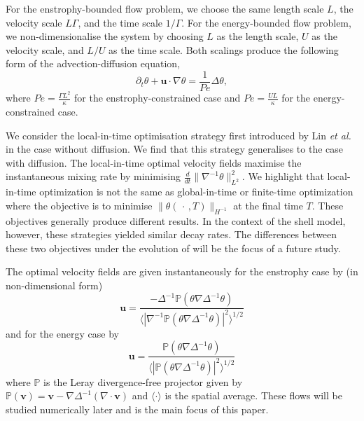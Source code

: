 \documentclass[12pt]{iopart}
\newcommand{\ddt}[1]{\frac{d #1}{dt}}
\newcommand{\hmone}[1]{\|\nabla^{-1} #1\|_{L^{2}}}
\renewcommand{\vec}[1]{\mathbf{#1}}
\newcommand{\ppt}[1]{\partial_{t} #1}
\newcommand{\lap}{\Delta }
\newcommand{\invlap}{\Delta^{-1}}
\begin{document}
For the enstrophy-bounded flow problem, we choose the same length scale $L$, the velocity scale $L\Gamma $, and  the time scale $1/\Gamma$. For the energy-bounded flow problem, we non-dimensionalise the system by choosing $L$ as the length scale, $U$ as the velocity scale, and $L/U$ as the time scale.  Both scalings produce the following form of the advection-diffusion equation,
\begin{equation}
\label{eq:nd_ade}
	\ppt{\theta}+\mathbf{u}\cdot \nabla \theta=\frac{1}{Pe} \lap\theta,
\end{equation}
where $Pe=  \frac{\Gamma L^2}{\kappa}$ for the enstrophy-constrained case and $Pe= \frac{UL}{\kappa}$ for the energy-constrained case.   

We consider the local-in-time optimisation strategy first introduced by Lin {\it et al.} \cite{JFM2011} in the case without diffusion. We find that this strategy generalises to the case with diffusion. The local-in-time optimal velocity fields maximise the instantaneous mixing rate by minimising $\ddt{}\hmone{\theta}^2$. We highlight that local-in-time optimization is not the same as global-in-time or finite-time optimization where the objective is to minimise $\|\theta(\,\cdot\, , T)\|_{H^{-1}}$ at the final time $T$. These objectives generally produce different results.  In the context of the shell model, however, these strategies yielded similar decay rates. The differences between these two objectives under the evolution of    will be the focus of a future study. 

The optimal velocity fields are given instantaneously for the enstrophy case by (in non-dimensional form)
%
\begin{equation}
\mathbf{u}= \frac{-\invlap\mathds{P}(\theta \nabla \invlap\theta)}{\langle |\nabla^{-1}\mathds{P}(\theta \nabla \invlap\theta)|^2\rangle^{1/2}}
\end{equation}
%
and for the energy case by 
% 
\begin{equation}
\mathbf{u}= \frac{\mathds{P}(\theta \nabla \invlap\theta)}{\langle |\mathds{P}(\theta \nabla \invlap\theta)|^2\rangle^{1/2}}
\end{equation} 
%
where $\mathds{P}$ is the Leray divergence-free projector given by $\mathds{P}(\vec{v}) = \vec{v} - \nabla \Delta^{-1}(\nabla \cdot \vec{v})$ and $\langle \cdot \rangle$ is the spatial average. These flows will be studied numerically later and is the main focus of this paper.
\end{document}
